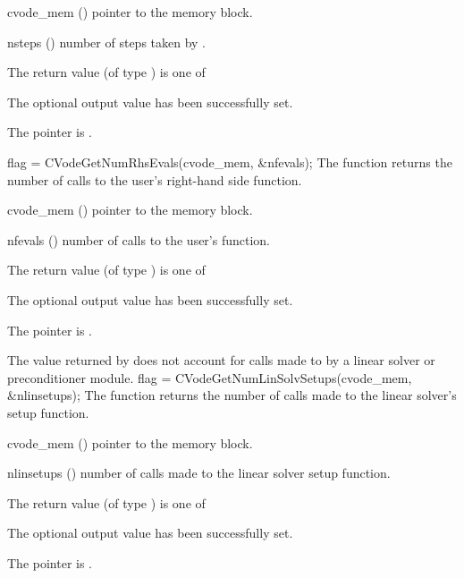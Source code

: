 {
  \begin{args}
  \item[cvode\_mem] ()
    pointer to the {\cvodes} memory block.
  \item[nsteps] ()
    number of steps taken by {\cvodes}.
  \end{args}
}
{
  The return value  (of type ) is one of
  \begin{args}
  \item[\Id{CV\_SUCCESS}] 
    The optional output value has been successfully set.
  \item[\Id{CV\_MEM\_NULL}]
    The  pointer is .
  \end{args}
}
{}
{
  flag = CVodeGetNumRhsEvals(cvode\_mem, \&nfevals);
}
{
  The function  returns the 
  number of calls to the user's right-hand side function.
}
{
  \begin{args}
  \item[cvode\_mem] ()
    pointer to the {\cvodes} memory block.
  \item[nfevals] ()
    number of calls to the user's  function.
  \end{args}
}
{
  The return value  (of type ) is one of
  \begin{args}
  \item[\Id{CV\_SUCCESS}] 
    The optional output value has been successfully set.
  \item[\Id{CV\_MEM\_NULL}]
    The  pointer is .
  \end{args}
}
{
  The  value returned by  does not
  account for calls made to  by a linear solver or preconditioner 
  module. 
}
{
  flag = CVodeGetNumLinSolvSetups(cvode\_mem, \&nlinsetups);
}
{
  The function  returns the
  number of calls made to the linear solver's setup function.
}
{
  \begin{args}[nlinsetups]
  \item[cvode\_mem] ()
    pointer to the {\cvodes} memory block.
  \item[nlinsetups] ()
    number of calls made to the linear solver setup function.
  \end{args}
}
{
  The return value  (of type ) is one of
  \begin{args}
  \item[\Id{CV\_SUCCESS}] 
    The optional output value has been successfully set.
  \item[\Id{CV\_MEM\_NULL}]
    The  pointer is .
  \end{args}
}
